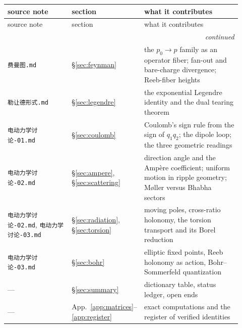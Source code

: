 {\small
\renewcommand{\arraystretch}{1.22}%
\begin{longtable}{@{}p{0.30\linewidth}p{0.16\linewidth}p{0.46\linewidth}@{}}
\toprule
source note & section & what it contributes \\
\midrule
\endfirsthead
\toprule
source note & section & what it contributes \\
\midrule
\endhead
\midrule
\multicolumn{3}{r}{\emph{continued}}\\
\endfoot
\bottomrule
\endlastfoot
\texttt{费曼图.md} & \S\ref{sec:feynman} & the $p_0\to p$ family as an operator
fiber; \ACS{} fan-out and bare-charge divergence; Reeb-fiber heights \\
\texttt{勒让德形式.md} & \S\ref{sec:legendre} & the exponential Legendre
identity and the dual tearing theorem \\
\texttt{电动力学讨论-01.md} & \S\ref{sec:coulomb} & Coulomb's sign rule from the
sign of $q_1q_2$; the dipole loop; the three geometric readings \\
\texttt{电动力学讨论-02.md} & \S\ref{sec:ampere}, \S\ref{sec:scattering} &
direction angle and the Amp\`ere coefficient; uniform motion in ripple
geometry; M\o ller versus Bhabha sectors \\
\texttt{电动力学讨论-02.md},
\texttt{电动力学讨论-03.md} & \S\ref{sec:radiation},
\S\ref{sec:torsion} & moving poles, cross-ratio holonomy, the torsion transport
and its Borel reduction \\
\texttt{电动力学讨论-03.md} & \S\ref{sec:bohr} & elliptic fixed points, Reeb
holonomy as action, Bohr--Sommerfeld quantization \\
--- & \S\ref{sec:summary} & dictionary table, status ledger, open ends \\
--- & App.~\ref{app:matrices}--\ref{app:register} & exact computations and the
register of verified identities \\
\end{longtable}}
